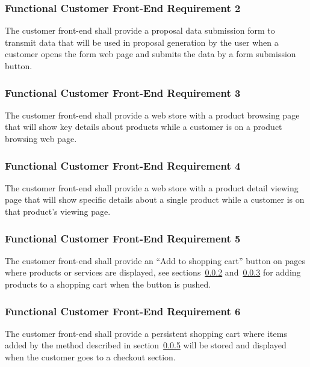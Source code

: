 \documentclass{article}
\begin{document}
\subsubsection{Functional Customer Front-End Requirement 2}
\label{func-cust-front-end-2}

The customer front-end shall provide a proposal data submission form to transmit
data that will be used in proposal generation by the user when a customer
opens the form web page and submits the data by a form submission button.

\subsubsection{Functional Customer Front-End Requirement 3}
\label{func-cust-front-end-3}

The customer front-end shall provide a web store with a product browsing page
that will show key details about products while a customer is on a product
browsing web page.

\subsubsection{Functional Customer Front-End Requirement 4}
\label{func-cust-front-end-4}

The customer front-end shall provide a web store with a product detail viewing
page that will show specific details about a single product while a customer is
on that product's viewing page.

\subsubsection{Functional Customer Front-End Requirement 5}
\label{func-cust-front-end-5}

The customer front-end shall provide an ``Add to shopping cart'' button on pages
where products or services are displayed, see
sections~\ref{func-cust-front-end-3} and~\ref{func-cust-front-end-4} for adding
products to a shopping cart when the button is pushed.

\subsubsection{Functional Customer Front-End Requirement 6}
\label{func-cust-front-end-6}

The customer front-end shall provide a persistent shopping cart where items
added by the method described in section~\ref{func-cust-front-end-6} will be
stored and displayed when the customer goes to a checkout section.
\end{document}
